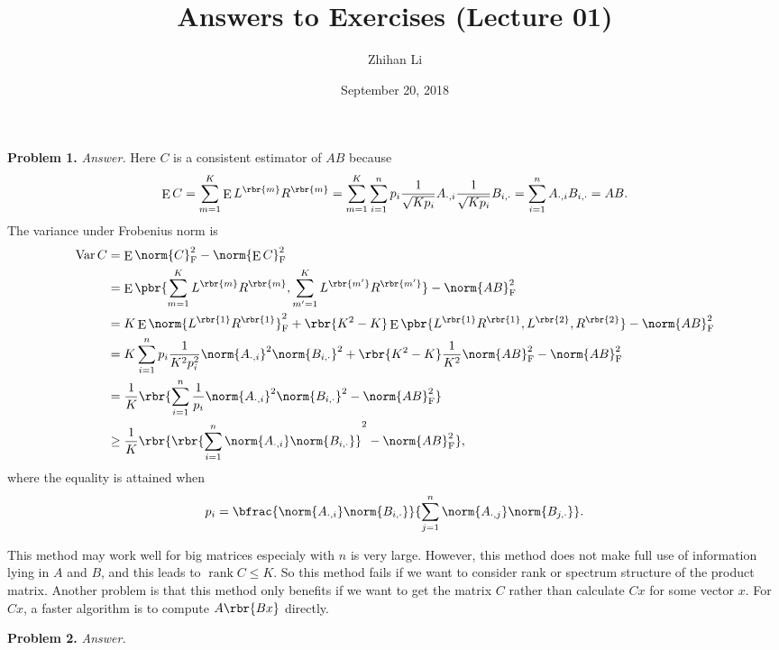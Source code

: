 \documentclass[english, nochinese]{pnote}
\title{Answers to Exercises (Lecture 01)}
\author{Zhihan Li}
\date{September 20, 2018}
\DeclareMathOperator\ope{\mathrm{E}}
\DeclareMathOperator\opvar{\mathrm{Var}}
\DeclareMathOperator\oprank{\mathrm{rank}}
\begin{document}
\maketitle

\textbf{Problem 1.} \textit{Answer.} Here $C$ is a consistent estimator of $ A B $ because
\begin{equation}
\ope C = \sum_{ m = 1 }^K \ope L^{\rbr{m}} R^{\rbr{m}} = \sum_{ m = 1 }^K \sum_{ i = 1 }^n p_i \frac{1}{\sqrt{ K p_i }} A_{ \cdot, i } \frac{1}{\sqrt{ K p_i }} B_{ i, \cdot } = \sum_{ i = 1 }^n A_{ \cdot, i } B_{ i, \cdot } = A B.
\end{equation}
The variance under Frobenius norm is
\begin{equation}
\begin{split}
\opvar C &= \ope \norm{C}_{\text{F}}^2 - \norm{ \ope C }_{\text{F}}^2 \\
&= \ope \pbr{ \sum_{ m = 1 }^K L^{\rbr{m}} R^{\rbr{m}}, \sum_{ m' = 1 }^K L^{\rbr{m'}} R^{\rbr{m'}} } - \norm{ A B }_{\text{F}}^2 \\
&= K \ope \norm{ L^{\rbr{1}} R^{\rbr{1}} }_{\text{F}}^2 + \rbr{ K^2 - K } \ope \pbr{ L^{\rbr{1}} R^{\rbr{1}}, L^{\rbr{2}}, R^{\rbr{2}} } -\norm{ A B }_{\text{F}}^2 \\
&= K \sum_{ i = 1 }^n p_i \frac{1}{ K^2  p_i^2} \norm{A_{ \cdot, i }}^2 \norm{B_{ i, \cdot }}^2 + \rbr{ K^2 - K } \frac{1}{K^2} \norm{ A B }_{\text{F}}^2 - \norm{ A B }_{\text{F}}^2 \\
&= \frac{1}{K} \rbr{ \sum_{ i = 1 }^n \frac{1}{p_i} \norm{A_{ \cdot, i }}^2 \norm{B_{ i, \cdot }}^2 - \norm{ A B }_{\text{F}}^2 } \\
&\ge \frac{1}{K} \rbr{ \rbr{ \sum_{ i = 1 }^n \norm{A_{ \cdot, i }} \norm{B_{ i, \cdot }} }^2 - \norm{ A B }_{\text{F}}^2 },
\end{split}
\end{equation}
where the equality is attained when
\begin{equation}
p_i = \bfrac{ \norm{A_{ \cdot, i }} \norm{B_{ i, \cdot }} }{ \sum_{ j = 1 }^n \norm{A_{ \cdot, j }} \norm{B_{ j, \cdot }} }.
\end{equation}

This method may work well for big matrices especialy with $n$ is very large. However, this method does not make full use of information lying in $A$ and $B$, and this leads to $ \oprank C \le K $. So this method fails if we want to consider rank or spectrum structure of the product matrix. Another problem is that this method only benefits if we want to get the matrix $C$ rather than calculate $ C x $ for some vector $x$. For $ C x $, a faster algorithm is to compute $ A \rbr{ B x } $ directly.

\textbf{Problem 2.} \textit{Answer.} 
\end{document}
